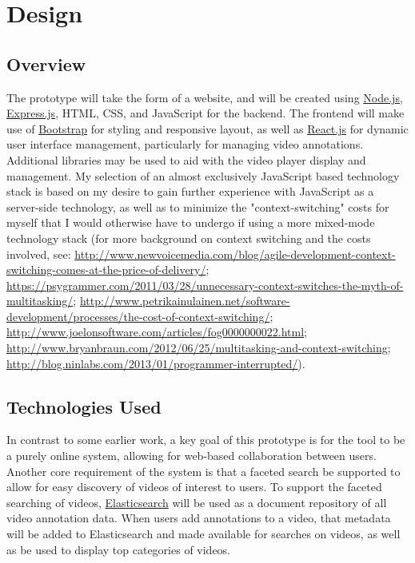 %
\chapter{Design}
\label{sec:design}


\section{Overview}
\label{sec:design:overview}

The prototype will take the form of a website, and will be created using \hyperref[glossary:node.js]{Node.js}, \hyperref[glossary:express.js]{Express.js}, HTML, CSS, and JavaScript for the backend.  The frontend will make use of \hyperref[glossary:bootstrap]{Bootstrap} for styling and responsive layout, as well as \hyperref[glossary:react.js]{React.js} for dynamic user interface management, particularly for managing video annotations.  Additional libraries may be used to aid with the video player display and management.  My selection of an almost exclusively JavaScript based technology stack is based on my desire to gain further experience with JavaScript as a server-side technology, as well as to minimize the "context-switching" costs for myself that I would otherwise have to undergo if using a more mixed-mode technology stack (for more background on context switching and the costs involved, see: \url{http://www.newvoicemedia.com/blog/agile-development-context-switching-comes-at-the-price-of-delivery/}; \url{https://psygrammer.com/2011/03/28/unnecessary-context-switches-the-myth-of-multitasking/}; \url{http://www.petrikainulainen.net/software-development/processes/the-cost-of-context-switching/}; \url{http://www.joelonsoftware.com/articles/fog0000000022.html}; \url{http://www.bryanbraun.com/2012/06/25/multitasking-and-context-switching}; \url{http://blog.ninlabs.com/2013/01/programmer-interrupted/}).


\cite{WEB:NewVoiceMedia:2012,WEB:Psygrammer:2011,WEB:Kainulainen:2014,WEB:Spolsky:2001,WEB:Braun:2012,WEB:Ninlabs:2013}


\section{Technologies Used}
\label{sec:overview:technologies-used}

In contrast to some earlier work, a key goal of this prototype is for the tool to be a purely online system, allowing for web-based collaboration between users.  Another core requirement of the system is that a faceted search be supported to allow for easy discovery of videos of interest to users.  To support the faceted searching of videos, \hyperref[glossary:elasticsearch]{Elasticsearch} will be used as a document repository of all video annotation data.  When users add annotations to a video, that metadata will be added to Elasticsearch and made available for searches on videos, as well as be used to display top categories of videos.

